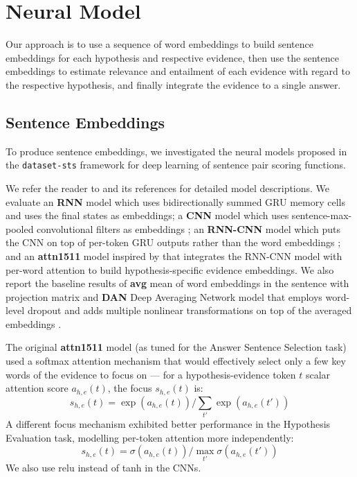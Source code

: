 \documentclass[11pt]{article}
\begin{document}
\section{Neural Model}
\label{sec:model}

Our approach is to use a sequence of word embeddings to build
sentence embeddings for each hypothesis and respective evidence,
then use the sentence embeddings to estimate relevance and
entailment of each evidence with regard to the respective
hypothesis, and finally integrate the evidence to a single answer.

\subsection{Sentence Embeddings}

To produce sentence embeddings, we investigated the
neural models proposed in the \texttt{da\-ta\-set-sts} framework
for deep learning of sentence pair scoring functions. \cite{sps}

We refer the reader to \cite{sps} and its references for detailed
model descriptions.  We evaluate an \textbf{RNN} model which uses bidirectionally
summed GRU memory cells \cite{GRU} and uses the final states as embeddings;
a \textbf{CNN} model which uses sentence-max-pooled convolutional filters as embeddings \cite{KimMultichannelCNN};
an \textbf{RNN-CNN} model which puts the CNN on top of per-token GRU outputs
rather than the word embeddings \cite{attn1511}; and an \textbf{attn1511} model
inspired by \cite{attn1511} that integrates the RNN-CNN model
with per-word attention to build hypothesis-specific evidence embeddings.
We also report the baseline results of
\textbf{avg} mean of word embeddings in the sentence with projection matrix
and \textbf{DAN} Deep Averaging Network model that employs word-level dropout
and adds multiple nonlinear transformations on top of the averaged embeddings \cite{DAN}.

The original \textbf{attn1511} model \cite{sps} (as tuned for the Answer Sentence Selection task)
used a softmax attention mechanism that would effectively select only a few key words
of the evidence to focus on --- for a hypothesis-evidence token $t$ scalar attention score $a_{h,e}(t)$,
the focus $s_{h,e}(t)$ is:
$$ s_{h,e}(t) = \exp(a_{h,e}(t)) / \sum_{t'} \exp(a_{h,e}(t')) $$
A different focus mechanism exhibited better performance in the Hypothesis Evaluation task,
modelling per-token attention more independently:
$$ s_{h,e}(t) = \sigma(a_{h,e}(t)) / \max_{t'} \sigma(a_{h,e}(t')) $$
We also use relu instead of tanh in the CNNs.
\end{document}
